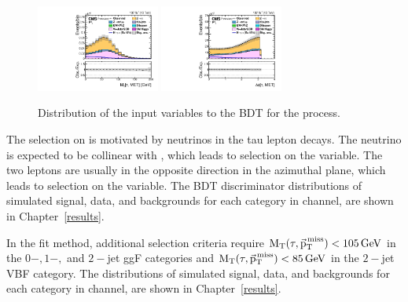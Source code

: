 \begin{figure}[htbp!]
  \includegraphics[width=0.36\textwidth]{plots/chapter6/mutau/MTTauMET.pdf}
  \includegraphics[width=0.36\textwidth]{plots/chapter6/mutau/dPhiTauMET.pdf}\\
  \caption{Distribution of the input variables to the BDT for the \muhad process.}
  \label{fig:input_mt}
\end{figure}

The selection on \ptvecmiss is motivated by neutrinos in the tau lepton decays. The neutrino is expected to be collinear with \tauh, which leads to selection on the \dphitauhmet variable. The two leptons are usually in the opposite direction in the azimuthal plane, which leads to selection on the \dphimtauh variable. The BDT discriminator distributions of simulated signal, data, and backgrounds for each category in \muhad channel, are shown in Chapter~\ref{results}.

In the \mcol fit method, additional selection criteria require $\text{M}_\mathrm{T}(\tau,{\vec{\text{p}}}_{\mathrm{T}}^{\kern1pt\text{miss}}) < 105 \,\text{Ge\hspace{-.08em}V}$ in the $0-, 1-,$ and $2-$jet ggF categories and $\text{M}_\mathrm{T}(\tau,{\vec{\text{p}}}_{\mathrm{T}}^{\kern1pt\text{miss}}) < 85 \,\text{Ge\hspace{-.08em}V}$ in the $2-$jet VBF category. The \mcol distributions of simulated signal, data, and backgrounds for each category in \muhad channel, are shown in Chapter~\ref{results}.

